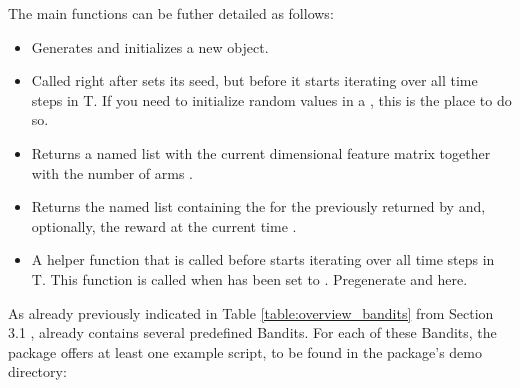 \documentclass{jss}
\begin{document}
The main  functions can be futher detailed as follows:

\begin{itemize}
  \item{}{ Generates and initializes a new  object. }
  \item{}{
     Called right after  sets its seed,
     but before it starts iterating over all time steps  in T. If you need to initialize random values in a ,
     this is the place to do so.
  }
  \item{}{
     Returns a named list 
     with the current  dimensional  feature matrix  together with the number of arms .
 }
  \item{}{
     Returns the named list  containing the 
     for the  previously returned by  and,
     optionally, the  reward
     at the current time .
 }
  \item{}{
     A helper function that is called before  starts iterating over all time steps  in T.
     This function is called when  has been set to .
     Pregenerate  and  here.
  }
\end{itemize}

As already previously indicated in Table \ref{table:overview_bandits} from Section 3.1 ,  already contains several predefined Bandits. For each of these Bandits, the package offers at least one example script, to be found in the package’s demo directory:
\end{document}
